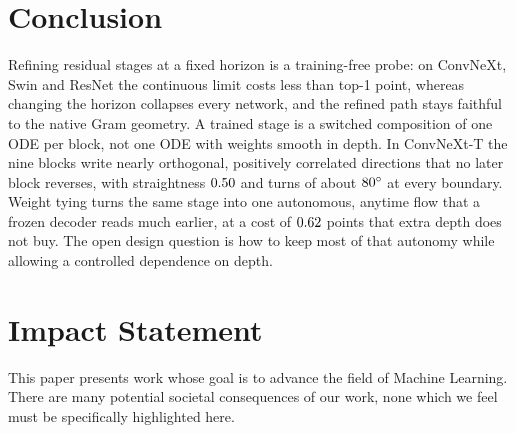 \section{Conclusion}
\label{sec:conclusion}

Refining residual stages at a fixed horizon is a training-free probe: on ConvNeXt,
Swin and ResNet the continuous limit costs less than  top-1 point,
whereas changing the horizon collapses every network, and the refined path stays
faithful to the native Gram geometry.
A trained stage is a switched composition of one ODE per block, not one ODE with
weights smooth in depth.
In ConvNeXt-T the nine blocks write nearly orthogonal, positively correlated
directions that no later block reverses, with straightness $0.50$ and turns of
about $80^\circ$ at every boundary.
Weight tying turns the same stage into one autonomous, anytime flow that a frozen
decoder reads much earlier, at a cost of $0.62$ points that extra depth does
not buy.
The open design question is how to keep most of that autonomy while allowing a
controlled dependence on depth.

\section*{Impact Statement}
This paper presents work whose goal is to advance the field of Machine Learning.
There are many potential societal consequences of our work, none which we feel must
be specifically highlighted here.
